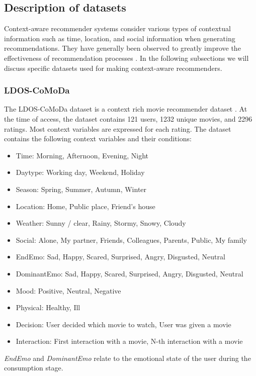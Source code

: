 \subsection{Description of datasets}\label{subsec:desc-of-datasets}
Context-aware recommender systems consider various types of contextual information such as time, location, and social information when generating recommendations.
They have generally been observed to greatly improve the effectiveness of recommendation processes \cite{aggarwal2016recommender}.
In the following subsections we will discuss specific datasets used for making context-aware recommenders.

\subsubsection{LDOS-CoMoDa}
The LDOS-CoMoDa dataset is a context rich movie recommender dataset \cite{comoda}.
At the time of access, the dataset contains 121 users, 1232 unique movies, and 2296 ratings.
Most context variables are expressed for each rating.
The dataset contains the following context variables and their conditions:
\begin{itemize}
    \item Time: Morning, Afternoon, Evening, Night
    \item Daytype: Working day, Weekend, Holiday
    \item Season: Spring, Summer, Autumn, Winter
    \item Location:  Home, Public place, Friend's house
    \item Weather: Sunny / clear, Rainy, Stormy, Snowy, Cloudy
    \item Social: Alone, My partner, Friends, Colleagues, Parents, Public, My family
    \item EndEmo: Sad, Happy, Scared, Surprised, Angry, Disgusted, Neutral
    \item DominantEmo: Sad, Happy, Scared, Surprised, Angry, Disgusted, Neutral
    \item Mood: Positive, Neutral, Negative
    \item Physical: Healthy, Ill
    \item Decision: User decided which movie to watch, User was given a movie
    \item Interaction: First interaction with a movie, N-th interaction with a movie
\end{itemize}
\textit{EndEmo} and \textit{DominantEmo} relate to the emotional state of the user during the consumption stage.
